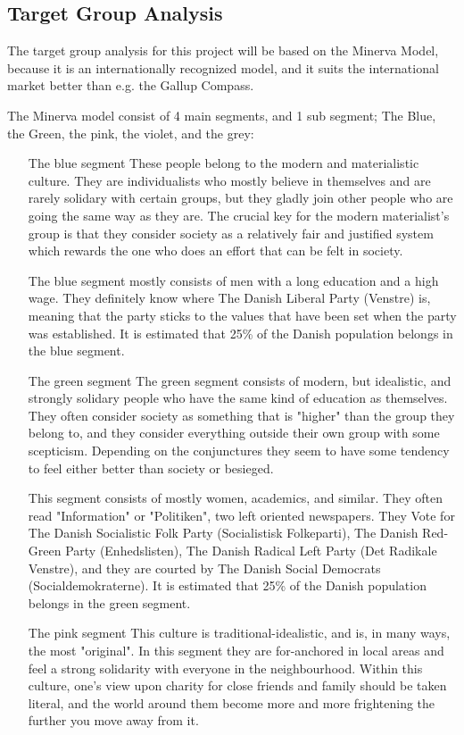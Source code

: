 \subsection{Target Group Analysis}
The target group analysis for this project will be based on the Minerva Model, because it is an internationally recognized model, and it suits the international market better than e.g. the Gallup Compass.

The Minerva model consist of 4 main segments, and 1 sub segment; The Blue, the Green, the pink, the violet, and the grey:
\begin{itemize}
\item[The blue segment]
These people belong to the modern and materialistic culture. They are individualists who mostly believe in themselves and are rarely solidary with certain groups, but they gladly join other people who are going the same way as they are. The crucial key for the modern materialist's group is that they consider society as a relatively fair and justified system which rewards the one who does an effort that can be felt in society.

The blue segment mostly consists of men with a long education and a high wage. They definitely know where The Danish Liberal Party (Venstre) is, meaning that the party sticks to the values that have been set when the party was established. It is estimated that 25\% of the Danish population belongs in the blue segment.

\item[The green segment]
The green segment consists of modern, but idealistic, and strongly solidary people who have the same kind of education as themselves. They often consider society as something that is "higher" than the group they belong to, and they consider everything outside their own group with some scepticism. Depending on the conjunctures they seem to have some tendency to feel either better than society or besieged.

This segment consists of mostly women, academics, and similar. They often read "Information" or "Politiken", two left oriented newspapers. They Vote for The Danish Socialistic Folk Party (Socialistisk Folkeparti), The Danish Red-Green Party (Enhedslisten), The Danish Radical Left Party (Det Radikale Venstre), and they are courted by The Danish Social Democrats (Socialdemokraterne).
It is estimated that 25\% of the Danish population belongs in the green segment.

\item[The pink segment]
This culture is traditional-idealistic, and is, in many ways, the most "original". In this segment they are for-anchored in local areas and feel a strong solidarity with everyone in the neighbourhood. Within this culture, one's view upon charity for close friends and family should be taken literal, and the world around them become more and more frightening the further you move away from it.


\end{itemize}
